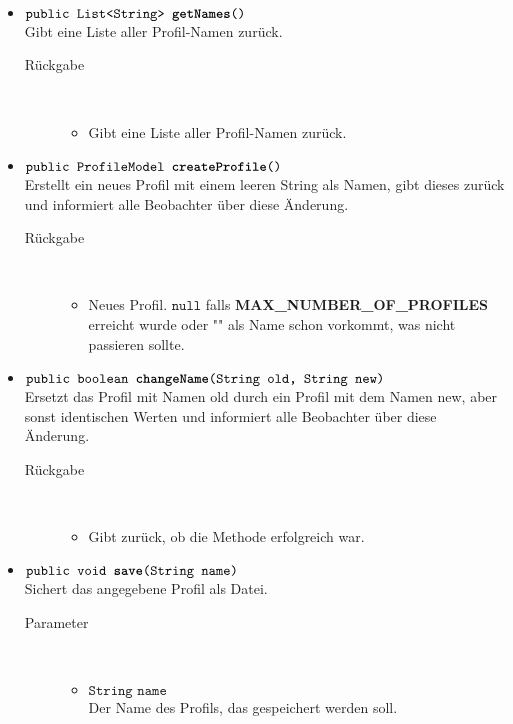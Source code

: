 \begin{description}
\begin{itemize}
		\item $\texttt{public List<String> \textbf{getNames}()}$ \\ Gibt eine Liste aller Profil-Namen zurück.
		\begin{description}
			\item[Rückgabe] \hfill \\
			\vspace{-.8cm}
			\begin{itemize}
				\item Gibt eine Liste aller Profil-Namen zurück.	
			\end{itemize}
		\end{description}
		
		\item $\texttt{public ProfileModel \textbf{createProfile}()}$ \\ Erstellt ein neues Profil mit einem leeren String als Namen, gibt dieses zurück und informiert alle Beobachter über diese Änderung.
		\begin{description}
			\item[Rückgabe] \hfill \\
			\vspace{-.8cm}
			\begin{itemize}
				\item Neues Profil. $\texttt{null}$ falls \textbf{MAX\_NUMBER\_OF\_PROFILES} erreicht wurde oder "" als Name schon vorkommt, was nicht passieren sollte.
			\end{itemize}
		\end{description}
		
		\item $\texttt{public boolean \textbf{changeName}(String old, String new)}$ \\ Ersetzt das Profil mit Namen old durch ein Profil mit dem Namen new, aber sonst identischen Werten und informiert alle Beobachter über diese Änderung.
		\begin{description}
			\item[Rückgabe] \hfill \\
			\vspace{-.8cm}
			\begin{itemize}
				\item Gibt zurück, ob die Methode erfolgreich war.
			\end{itemize}
		\end{description}
		
		\item $\texttt{public void \textbf{save}(String name)}$ \\ Sichert das angegebene Profil als Datei.
		\begin{description}
			\item[Parameter] \hfill \\
			\vspace{-.8cm}
			\begin{itemize}
				\item $\texttt{String name}$ \\ Der Name des Profils, das gespeichert werden soll.
			\end{itemize}
		\end{description}
		

\end{itemize}
\end{description}
